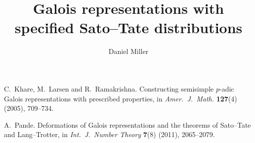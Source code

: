 \documentclass{article}
\title{Galois representations with specified Sato--Tate distributions}
\author{Daniel Miller}
\begin{document}
\maketitle





\cite{klr}
\cite{pande}





\begin{thebibliography}{9}
C.~Khare, M.~Larsen and R.~Ramakrishna. Constructing semisimple $p$-adic Galois 
representations with prescribed properties, in \emph{Amer.~J.~Math.} 
\textbf{127}(4) (2005), 709--734. 

A.~Pande. Deformations of Galois representations and the theorems of Sato--Tate 
and Lang--Trotter, in \emph{Int.~J.~Number Theory} \textbf{7}(8) (2011), 
2065--2079. 
\end{thebibliography}
\end{document}
